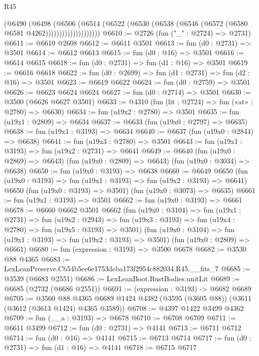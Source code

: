 \begin{lexlean}{R45}
\begin{coremodule}
                        (@6490
                          (@6498
                            (@6506
                              (@6514
                                (@6522
                                  (@6530 (@6538 (@6546 (@6572 (@6580 @6581 @4262))))))))))))))))))))
@6610 := @2726 (fun ("_" : @2724) => @2731)
@6611 := @6610 @2608
@6612 := @6611 @3501
@6613 := fun (d0 : @2731) => @3501
@6614 := @6612 @6613
@6615 := fun (d0 : @16) => @3501
@6616 := @6614 @6615
@6618 := fun (d0 : @2731) => fun (d1 : @16) => @3501
@6619 := @6616 @6618
@6622 := fun (d0 : @2699) => fun (d1 : @2731) => fun (d2 : @16) => @3501
@6623 := @6619 @6622
@6624 := fun (d0 : @2759) => @3501
@6626 := @6623 @6624 @6624
@6627 := fun (d0 : @2714) => @3501
@6630 := @3500 (@6626 @6627 @3501)
@6633 := @4310 (fun (lit : @2724) => fun («at» : @2780) => @6630)
@6634 := fun (u19x2 : @2780) => @3501
@6635 := fun (u19x1 : @2809) => @6634
@6637 := @6633 (fun (u19x0 : @2797) => @6635)
@6638 := fun (u19x1 : @3193) => @6634
@6640 := @6637 (fun (u19x0 : @2844) => @6638)
@6641 := fun (u19x3 : @2780) => @3501
@6643 := fun (u19x1 : @3193) => fun (u19x2 : @2731) => @6641
@6649 := @6640
    (fun (u19x0 : @2869) => @6643)
    (fun (u19x0 : @2809) => @6643)
    (fun (u19x0 : @3034) => @6638)
@6650 := fun (u19x0 : @3193) => @6638
@6660 := @6649
    @6650
    (fun (u19x0 : @3193) => fun (u19x1 : @3193) => fun (u19x2 : @3193) => @6641)
    @6650
    (fun (u19x0 : @3193) => @3501)
    (fun (u19x0 : @3073) => @6635)
@6661 := fun (u19x1 : @3193) => @3501
@6662 := fun (u19x0 : @3193) => @6661
@6678 := @6660
    @6662
    @3501
    @6662
    (fun (u19x0 : @3104) =>
    fun (u19x1 : @2731) =>
    fun (u19x2 : @2943) =>
    fun (u19x3 : @3193) => fun (u19x4 : @2780) => fun (u19x5 : @3193) => @3501)
    (fun (u19x0 : @3104) => fun (u19x1 : @3193) => fun (u19x2 : @3193) => @3501)
    (fun (u19x0 : @2809) => @6661)
@6680 := fun (expression : @3193) => @3500 @6678
@6682 := @3530 @88 @4365
@6683 := LexLeanPreserve.Cb54b5ce6e1753deba173f2954c882034.R45.__fits_7
@6685 := @3539 (@6683 @2551)
@6686 := LexLeanBoot.RustBodies.unitLit
@6689 := @6685 (@2732 (@6686 @2551))
@6691 := (expression : @3193) -> @6682 @6689
@6705 := @3560
    @88
    @4365
    @6689
    @1424
    @4382
    (@3595 (@3605 @88))
    (@3611 (@3612 (@3613 @1424) @4365 @3589))
@6708 := @4397 @1422 @3499 @4362
@6709 := fun (__a : @3193) => @6678
@6710 := @6708 @6709
@6711 := @6611 @3499
@6712 := fun (d0 : @2731) => @4141
@6713 := @6711 @6712
@6714 := fun (d0 : @16) => @4141
@6715 := @6713 @6714
@6717 := fun (d0 : @2731) => fun (d1 : @16) => @4141
@6718 := @6715 @6717

\end{coremodule}
\end{lexlean}
